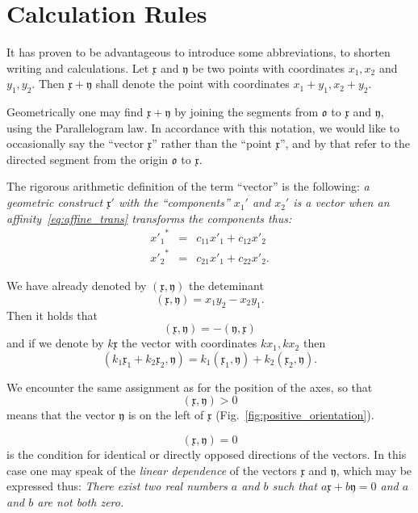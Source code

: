 \documentclass[11pt]{book} \usepackage{amssymb}
\newcommand{\myvec}[1]{\mathfrak{#1}}
\begin{document}
\section{Calculation Rules}
It has proven to be advantageous to introduce some abbreviations, to shorten
writing and calculations. Let $\myvec{x}$ and $\myvec{y}$ be two points with
coordinates $x_1,x_2$ and $y_1,y_2$. Then $\myvec{x}+\myvec{y}$ shall denote
the point with coordinates $x_1+y_1,x_2+y_2$. 

Geometrically one may find $\myvec{x}+\myvec{y}$ by joining the segments from
$\myvec{o}$ to $\myvec{x}$ and $\myvec{y}$, using the Parallelogram law. In
accordance with this notation, we would like to occasionally say the
``vector $\myvec{x}$'' rather than the ``point $\myvec{x}$'', and by that refer
to the directed segment from the origin $\myvec{o}$ to $\myvec{x}$.

The rigorous arithmetic definition of the term ``vector'' is the following:
{\em a geometric construct $\myvec{x}'$ with the ``components'' $x_1'$ and
$x_2'$ is a vector when an affinity~\ref{eq:affine_trans} transforms the
components thus:}
\begin{equation}
  \label{eq:vector_def}
  \begin{array}{rcl}
    {x'_1}^* &=& c_{11}x'_1+c_{12}x'_2\\
    {x'_2}^* &=& c_{21}x'_1+c_{22}x'_2.
  \end{array}  
\end{equation}

We have already denoted by $(\myvec{x},\myvec{y})$ the deteminant
\begin{equation}
  \label{eq:det_redefined}
  (\myvec{x},\myvec{y})=x_1y_2-x_2y_1.
\end{equation}
Then it holds that
\begin{equation}
  \label{eq:det_antisymmetric}
  (\myvec{x},\myvec{y})=-(\myvec{y},\myvec{x})
\end{equation}
and if we denote by $k\myvec{x}$ the vector with coordinates $kx_1,kx_2$ then
\begin{equation}
  \label{eq:det_bilinear}
  (k_1\myvec{x}_1+k_2\myvec{x}_2,\myvec{y})=k_1(\myvec{x}_1,\myvec{y})+k_2(\myvec{x}_2,\myvec{y}).
\end{equation}

We encounter the same assignment as for the position of the axes, so that
\begin{equation}
  (\myvec{x},\myvec{y}) > 0
\end{equation}
means that the vector $\myvec{y}$ is on the left of $\myvec{x}$ 
(Fig.~\ref{fig:positive_orientation}).

\begin{equation}
  (\myvec{x},\myvec{y}) = 0
\end{equation}
is the condition for identical or directly opposed directions of the vectors.
In this case one may speak of the {\em linear dependence} of the vectors
$\myvec{x}$ and $\myvec{y}$, which may be expressed thus:
{\em There exist two real numbers $a$ and $b$ such that 
$a\myvec{x}+b\myvec{y}=0$ and $a$ and $b$ are not both zero.}
 
\end{document}
